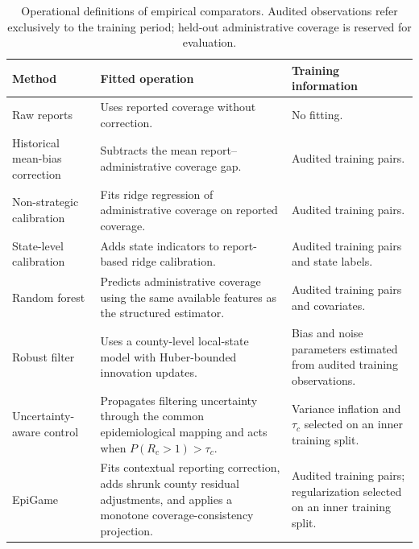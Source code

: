 \documentclass[sigconf,review]{acmart}
\newcommand{\model}{EpiGame}
\begin{document}
\begin{table}[t]
\centering
\caption{Operational definitions of empirical comparators.
Audited observations refer exclusively to the training
period; held-out administrative coverage is reserved for
evaluation.}
\label{tab:baseline-definitions}
\small
\setlength{\tabcolsep}{4pt}
\renewcommand{\arraystretch}{1.05}
\begin{tabularx}{\textwidth}{
@{}
>{\raggedright\arraybackslash}p{}
>{\raggedright\arraybackslash}X
>{\raggedright\arraybackslash}p{}
@{}}
\toprule
Method & Fitted operation & Training information \\
\midrule
Raw reports
& Uses reported coverage without correction.
& No fitting. \\

Historical mean-bias correction
& Subtracts the mean report--administrative coverage gap.
& Audited training pairs. \\

Non-strategic calibration
& Fits ridge regression of administrative coverage on
reported coverage.
& Audited training pairs. \\

State-level calibration
& Adds state indicators to report-based ridge calibration.
& Audited training pairs and state labels. \\

Random forest
& Predicts administrative coverage using the same available
features as the structured estimator.
& Audited training pairs and covariates. \\

Robust filter
& Uses a county-level local-state model with
Huber-bounded innovation updates.
& Bias and noise parameters estimated from audited
training observations. \\

Uncertainty-aware control
& Propagates filtering uncertainty through the common
epidemiological mapping and acts when
$P(R_c>1)>\tau_c$.
& Variance inflation and $\tau_c$ selected on an
inner training split. \\

\model{}
& Fits contextual reporting correction, adds shrunk
county residual adjustments, and applies a monotone
coverage-consistency projection.
& Audited training pairs; regularization selected on
an inner training split. \\
\bottomrule
\end{tabularx}
\end{table}
\end{document}
